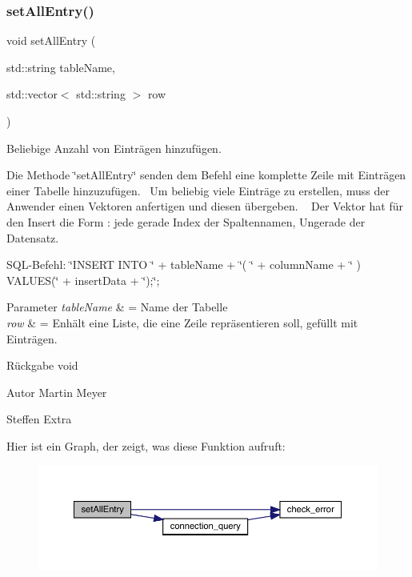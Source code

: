 \subsubsection{set\+All\+Entry()}
{\footnotesize\ttfamily void set\+All\+Entry (\begin{DoxyParamCaption}\item[{std\+::string}]{table\+Name,  }\item[{std\+::vector$<$ std\+::string $>$}]{row }\end{DoxyParamCaption})}



Beliebige Anzahl von Einträgen hinzufügen. 

Die Methode \char`\"{}set\+All\+Entry\char`\"{} senden dem Befehl eine komplette Zeile mit Einträgen einer Tabelle hinzuzufügen.~\newline
 Um beliebig viele Einträge zu erstellen, muss der Anwender einen Vektoren anfertigen und diesen übergeben. ~\newline
 Der Vektor hat für den Insert die Form \+: jede gerade Index der Spaltennamen, Ungerade der Datensatz.~\newline


S\+Q\+L-\/\+Befehl\+: \char`\"{}\+I\+N\+S\+E\+R\+T I\+N\+T\+O \char`\"{} + table\+Name + \char`\"{}( \char`\"{} + column\+Name + \char`\"{} ) V\+A\+L\+U\+E\+S(\char`\"{} + insert\+Data + \char`\"{});\char`\"{};


\begin{DoxyParams}{Parameter}
{\em table\+Name} & = Name der Tabelle \\
\hline
{\em row} & = Enhält eine Liste, die eine Zeile repräsentieren soll, gefüllt mit Einträgen.\\
\hline
\end{DoxyParams}
\begin{DoxyReturn}{Rückgabe}
void
\end{DoxyReturn}
\begin{DoxyAuthor}{Autor}
Martin Meyer 

Steffen Extra 
\end{DoxyAuthor}
Hier ist ein Graph, der zeigt, was diese Funktion aufruft\+:\nopagebreak
\begin{figure}[H]
\begin{center}
\leavevmode
\includegraphics[width=350pt]{entry_8cpp_aeb45ccd70b8692b592754a0886c2d109_cgraph}
\end{center}
\end{figure}
\mbox{\label{entry_8cpp_a1faab165d9a7dc43808e1a0075e007f9}} 
